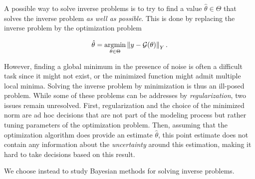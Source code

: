 A possible way to solve inverse problems is to try to find a value $\hat \theta \in \Theta$ that solves the inverse problem \textit{as well as possible}. This is done by replacing the inverse problem by the optimization problem

\begin{equation*}
  \hat\theta = \underset{\theta \in \Theta}{\text{argmin}} \left\lVert y - \mathcal{G}(\theta) \right\rVert_Y.
\end{equation*}

However, finding a global minimum in the presence of noise is often a difficult task since it might not exist, or the minimized function might admit multiple local minima. Solving the inverse problem by minimization is thus an ill-posed problem. While some of these problems can be addresses by \textit{regularization}, two issues remain unresolved. First, regularization and the choice of the minimized norm are ad hoc decisions that are not part of the modeling process but rather tuning parameters of the optimization problem. Then, assuming that the optimization algorithm does provide an estimate $\hat\theta$, this point estimate does not contain any information about the \textit{uncertainty} around this estimation, making it hard to take decisions based on this result.

We choose instead to study Bayesian methods for solving inverse problems.


